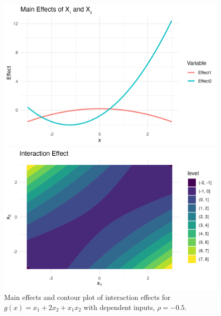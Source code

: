 \begin{figure}[htpb]
    \centering
    \begin{minipage}[t]{0.49\textwidth}
        \centering
        \includegraphics[width=\textwidth]{images/full_a1p00_a2p20_a11p00_a22p10_a12m05_rhop05_main.png}
    \end{minipage}%
    \hfill
    \begin{minipage}[t]{0.49\textwidth}
        \centering
        \includegraphics[width=\textwidth]{images/full_a1p00_a2p20_a11p00_a22p10_a12m05_rhop05_interaction.png}
        \caption{Main effects and contour plot of interaction effects for $g(x) = x_1 + 2 x_2 + x_1 x_2$ with dependent inputs, $\rho = -0.5$.}
        \label{fig:full_rho_neg0.5}
    \end{minipage}
\end{figure}


